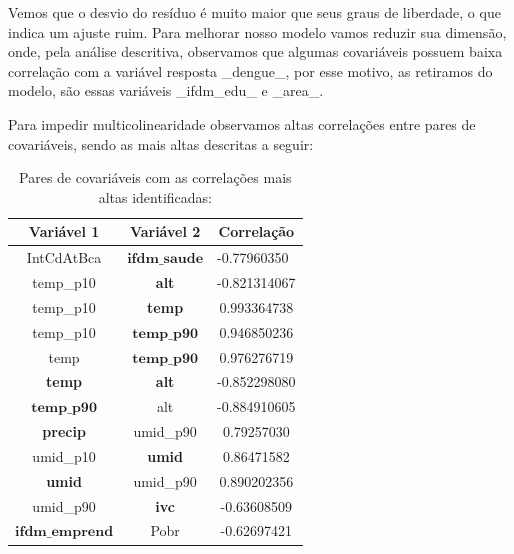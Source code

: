 \documentclass[12pt,a4paper]{article}\usepackage[]{graphicx}\usepackage[]{color}
\begin{document}

Vemos que o desvio do resíduo é muito maior que seus graus de liberdade, o que indica um ajuste ruim. Para melhorar nosso modelo vamos reduzir sua dimensão, onde, pela análise descritiva, observamos que algumas covariáveis possuem baixa correlação com a variável resposta \_dengue\_, por esse motivo, as retiramos do modelo, são essas variáveis \_ifdm\_edu\_ e \_area\_.

Para impedir multicolinearidade observamos altas correlações entre pares de covariáveis, sendo as mais altas descritas a seguir:

\begin{table}[H]
\caption{Pares de covariáveis com as correlações mais altas identificadas:} 
\begin{center}
\begin{tabular}{c|c|c}
\hline
Variável 1                         & Variável 2      & Correlação                      \\ \hline
IntCdAtBca                         & $\mathbf{ifdm\_saude}$ & \multicolumn{1}{l}{-0.77960350} \\
temp\_p10                          & \textbf{alt}         & -0.821314067                    \\
temp\_p10                          & \textbf{temp}        & 0.993364738                     \\
temp\_p10                          & $\mathbf{temp\_p90}$   & 0.946850236                     \\
temp                               & $\mathbf{temp\_p90}$   & 0.976276719                     \\
\textbf{temp}                           & \textbf{alt}         & -0.852298080                    \\
$\mathbf{temp\_p90}$                      & alt             & -0.884910605                    \\
\textbf{precip}                         & umid\_p90       & 0.79257030                      \\
umid\_p10                          & \textbf{umid}        & 0.86471582                      \\
\textbf{umid}                           & umid\_p90       & 0.890202356                     \\
umid\_p90                          & \textbf{ivc}         & -0.63608509                     \\
$\mathbf{ifdm\_emprend}$                  & Pobr            & -0.62697421                     \\

\end{tabular}
\end{center}
\end{table}
\end{document}
